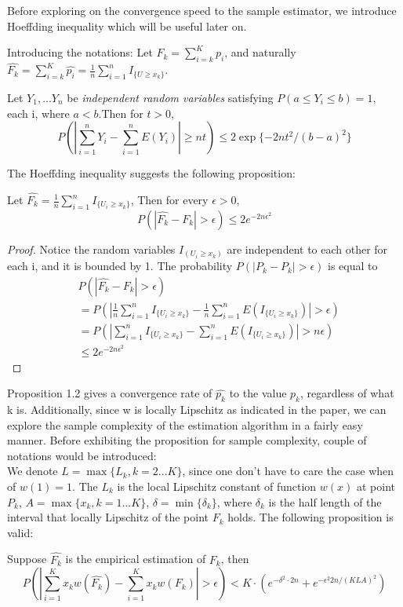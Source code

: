 Before exploring on the convergence speed to the sample estimator, we introduce Hoeffding inequality which will be useful later on. 

Introducing the notations:
Let $F_k = \sum_{i=k}^K p_i$, and naturally $\hat{F_k} =\sum_{i=k}^K \hat{p_i}= \frac{1}{n} \sum_{i=1}^n I_{\{U\geq  x_k\} } $. 


\begin{lemma}
Let $Y_1,...Y_n$ be \emph{independent random variables} satisfying $P(a\leq Y_i \leq b)= 1,$ each i, where $a<b.
$Then for $t>0$,
$$P(\left|\sum_{i=1}^n Y_i -\sum_{i=1}^n E(Y_i)\right| \geq nt ) \leq 2\exp{\{-2nt^2 /(b-a)^2\}} $$
\end{lemma}

The Hoeffding inequality suggests the following proposition:
\begin{proposition}
Let $\hat{F_k} = \frac{1}{n} \sum_{i=1}^n I_{\{U_i \geq x_k\}}$, Then for every $\epsilon >0$, 
$$P(|\hat{F_k}-F_k| > \epsilon) \leq 2 e^{-2n \epsilon^2} $$
\end{proposition}
\begin{proof}
Notice the random variables $I_{(U_i \geq  x_k) }$ are independent to each other for each i, and it is bounded by 1. 
The probability $P(\left|P_k- P_k \right| > \epsilon)$ is equal to 
\begin{align*}
&
P(\left|\hat{F_k}- F_k \right| > \epsilon) \\ & = P(\left| \frac{1}{n} \sum_{i=1}^n I_{\{U_i \geq
x_k\}} - \frac{1}{n} \sum_{i=1}^n E(I_{\{U_i \geq x_k\}}) \right| > \epsilon) \\ & = P(\left|
\sum_{i=1}^n I_{\{U_i \geq x_k\}} - \sum_{i=1}^n E(I_{\{U_i \geq x_k\}}) \right| > n\epsilon) \\ &
    \leq 2e^{-2n \epsilon^2}
\end{align*}

\end{proof}
Proposition 1.2 gives a convergence rate of $\hat{p_k}$ to the value $p_k$, regardless of what k is. 
Additionally, since w is locally Lipschitz as indicated in the paper, we can explore the sample complexity of the estimation algorithm in a fairly easy manner. 
Before exhibiting the proposition for sample complexity, couple of notations would be introduced: 
\\
We denote $L=\max\{L_k, k=2...K\} $, since one don't have to care the case when of $w(1)=1$. The $L_k$ is the local Lipschitz constant of function $w(x)$ at point 
$P_k$, 
$A=\max\{x_k, k=1...K\}$, $\delta =\min\{\delta_k\}$, where $\delta_k$ is the half length of the interval that locally Lipschitz of the point $F_k$ holds.
The following proposition is valid: 
\begin{proposition}
Suppose $\hat{F_k}$ is the empirical estimation of $F_k$, then 
$$P(\left| \sum_{i=1}^K x_k w(\hat{F_k}) - \sum_{i=1}^K x_k w(F_k) \right| >\epsilon) < K\cdot (
e^{-\delta^2\cdot 2n} + e^{-\epsilon^2 2n/(KLA)^2}) $$ 
\end{proposition}


